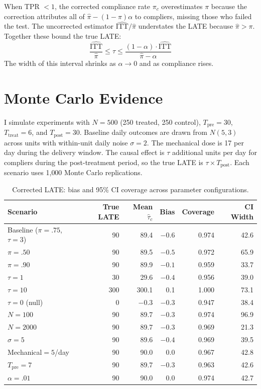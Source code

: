 \documentclass[12pt]{article}
\begin{document}
When TPR $< 1$, the corrected compliance rate $\pi_c$ overestimates $\pi$ because the correction attributes all of $\hat{\pi} - (1-\pi)\alpha$ to compliers, missing those who failed the test. The uncorrected estimator $\widehat{\text{ITT}}/\hat{\pi}$ understates the LATE because $\hat{\pi} > \pi$. Together these bound the true LATE:
\begin{equation}\label{eq:bounds}
\frac{\widehat{\text{ITT}}}{\hat{\pi}} \leq \tau \leq \frac{(1-\alpha) \cdot \widehat{\text{ITT}}}{\hat{\pi} - \alpha}
\end{equation}
The width of this interval shrinks as $\alpha \to 0$ and as compliance rises.

\section{Monte Carlo Evidence}

I simulate experiments with $N = 500$ (250 treated, 250 control), $T_{\text{pre}} = 30$, $T_{\text{treat}} = 6$, and $T_{\text{post}} = 30$. Baseline daily outcomes are drawn from $N(5, 3)$ across units with within-unit daily noise $\sigma = 2$. The mechanical dose is 17 per day during the delivery window. The causal effect is $\tau$ additional units per day for compliers during the post-treatment period, so the true LATE is $\tau \times T_{\text{post}}$. Each scenario uses 1{,}000 Monte Carlo replications.

\begin{table}[ht]
\centering
\caption{Corrected LATE: bias and 95\% CI coverage across parameter configurations.}
\label{tab:coverage}
\smallskip
\begin{tabular}{@{}lrrrrr@{}}
\toprule
Scenario & True LATE & Mean $\hat{\tau}_c$ & Bias & Coverage & CI Width \\
\midrule
Baseline ($\pi{=}.75$, $\tau{=}3$) & 90 & 89.4 & $-0.6$ & 0.974 & 42.6 \\
$\pi{=}.50$ & 90 & 89.5 & $-0.5$ & 0.972 & 65.9 \\
$\pi{=}.90$ & 90 & 89.9 & $-0.1$ & 0.959 & 33.7 \\
$\tau{=}1$ & 30 & 29.6 & $-0.4$ & 0.956 & 39.0 \\
$\tau{=}10$ & 300 & 300.1 & 0.1 & 1.000 & 73.1 \\
$\tau{=}0$ (null) & 0 & $-0.3$ & $-0.3$ & 0.947 & 38.4 \\
$N{=}100$ & 90 & 89.7 & $-0.3$ & 0.974 & 96.9 \\
$N{=}2000$ & 90 & 89.7 & $-0.3$ & 0.969 & 21.3 \\
$\sigma{=}5$ & 90 & 89.6 & $-0.4$ & 0.969 & 39.5 \\
Mechanical${=}5$/day & 90 & 90.0 & 0.0 & 0.967 & 42.8 \\
$T_{\text{pre}}{=}7$ & 90 & 89.7 & $-0.3$ & 0.963 & 42.6 \\
$\alpha{=}.01$ & 90 & 90.0 & 0.0 & 0.974 & 42.7 \\
\bottomrule
\end{tabular}
\end{table}
\end{document}
